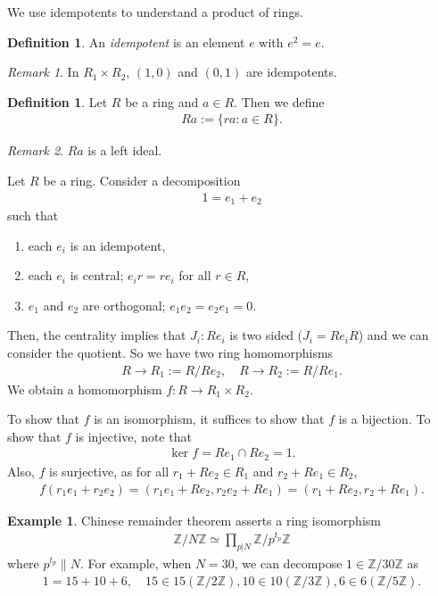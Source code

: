 \documentclass[12pt]{report}
\theoremstyle{plain}
\theoremstyle{remark}
\newtheorem*{remark}{Remark}
\theoremstyle{definition}
\newtheorem{definition}[theorem]{Definition}
\newtheorem{example}[theorem]{Example}
\newcommand{\Z}{\mathbb{Z}}
\begin{document}
We use idempotents to understand a product of rings.
\begin{definition}
    An \emph{idempotent} is an element $e$ with $e^2=e$.
\end{definition}
\begin{remark}
    In $R_1\times R_2$, $(1,0)$ and $(0,1)$ are idempotents.
\end{remark}

\begin{definition}
    Let $R$ be a ring and $a\in R$. Then we define
    \begin{align*}
        Ra := \{ra:a\in R\}.
    \end{align*}
\end{definition}
\begin{remark}
    $Ra$ is a left ideal.
\end{remark}

Let $R$ be a ring. Consider a decomposition
\begin{align*}
    1=e_1+e_2
\end{align*}
such that
\begin{enumerate}
    \item each $e_i$ is an idempotent,
    \item each $e_i$ is central; $e_ir=re_i$ for all $r\in R$,
    \item $e_1$ and $e_2$ are orthogonal; $e_1e_2=e_2e_1=0$.
\end{enumerate}
Then, the centrality implies that $J_i:Re_i$ is two sided ($J_i=Re_i R$) and we can consider the quotient. So we have two ring homomorphisms
\begin{align*}
    R\rightarrow R_1:=R/Re_2,\quad R\rightarrow R_2:=R/Re_1.
\end{align*}
We obtain a homomorphism $f:R\rightarrow R_1\times R_2$.

To show that $f$ is an isomorphism, it suffices to show that $f$ is a bijection. To show that $f$ is injective, note that
\begin{align*}
    \ker f = Re_1 \cap R e_2 = 1.
\end{align*}
Also, $f$ is surjective, as for all $r_1+Re_2\in R_1$ and $r_2+Re_1\in R_2$,
\begin{align*}
    f(r_1e_1+r_2e_2) = (r_1e_1+Re_2,r_2e_2+Re_1) = (r_1+Re_2,r_2+Re_1).
\end{align*}

\begin{example}
    Chinese remainder theorem asserts a ring isomorphism
    \begin{align*}
        \Z/N\Z\simeq \prod_{p|N} \Z/p^{t_p}\Z
    \end{align*}
    where $p^{t_p}\| N$. For example, when $N=30$, we can decompose $1\in \Z/30\Z$ as
    \begin{align*}
        1 = 15 + 10 + 6,\quad 15\in 15(\Z/2\Z),10\in 10(\Z/3\Z),6\in 6(\Z/5\Z).
    \end{align*}
\end{example}
\end{document}
